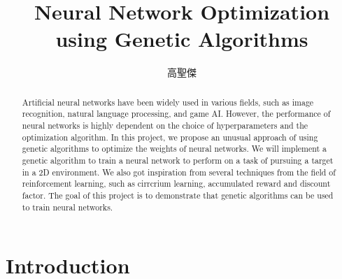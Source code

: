 \documentclass[sigconf]{acmart}
\begin{document}
\title{Neural Network Optimization using Genetic Algorithms}

\begin{CJK}{UTF8}{bkai}
  \author{高聖傑}

\renewcommand{\shortauthors}{Kao et al.}

\begin{abstract}
  Artificial neural networks have been widely used in various fields, such as image recognition, natural language processing, and game AI. However, the performance of neural networks is highly dependent on the choice of hyperparameters and the optimization algorithm. In this project, we propose an unusual approach of using genetic algorithms to optimize the weights of neural networks. We will implement a genetic algorithm to train a neural network to perform on a task of pursuing a target in a 2D environment. We also got inspiration from several techniques from the field of reinforcement learning, such as cirrcrium learning, accumulated reward and discount factor. The goal of this project is to demonstrate that genetic algorithms can be used to train neural networks.
\end{abstract}

\maketitle
\end{CJK}

\section{Introduction}
\end{document}
